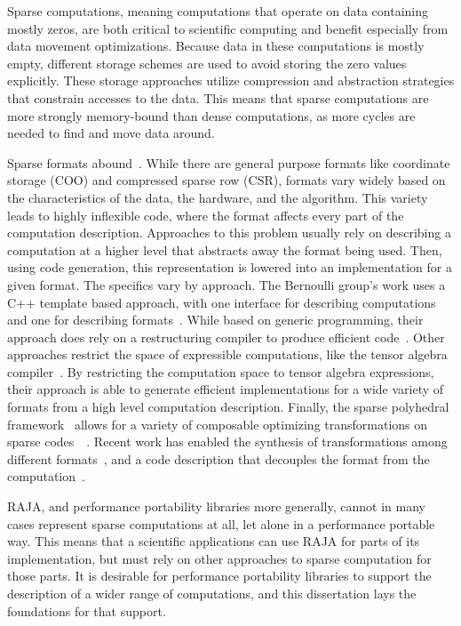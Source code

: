 Sparse computations, meaning computations that operate on data containing mostly zeros, are both critical to scientific computing and benefit especially from data movement optimizations.
Because data in these computations is mostly empty, different storage schemes are used to avoid storing the zero values explicitly. 
These storage approaches utilize compression and abstraction strategies that constrain accesses to the data.
This means that sparse computations are more strongly memory-bound than dense computations, as more cycles are needed to find and move data around.

Sparse formats abound~\cite{langr2015evaluation}. 
While there are general purpose formats like coordinate storage (COO) and compressed sparse row (CSR), formats vary widely based on the characteristics of the data, the hardware, and the algorithm.
This variety leads to highly inflexible code, where the format affects every part of the computation description.
Approaches to this problem usually rely on describing a computation at a higher level that abstracts away the format being used.
Then, using code generation, this representation is lowered into an implementation for a given format.
The specifics vary by approach.
The Bernoulli group's work uses a C++ template based approach, with one interface for describing computations~\cite{kotlyar1997relational} and one for describing formats~\cite{kotlyar1997compiling}.
While based on generic programming, their approach does rely on a restructuring compiler to produce efficient code~\cite{mateev2000bernoulli,ahmed2000framework}.
Other approaches restrict the space of expressible computations, like the tensor algebra compiler~\cite{kjolstad2017tensor}.
By restricting the computation space to tensor algebra expressions, their approach is able to generate efficient implementations for a wide variety of formats from a high level computation description.
Finally, the sparse polyhedral framework~\cite{strout2016approach} allows for a variety of composable optimizing transformations on sparse codes~~\cite{ahmad2017optimizing}.
Recent work has enabled the synthesis of transformations among different formats~\cite{popoola2023code}, and a code description that decouples the format from the computation~\cite{zhao2022polyhedral}.

RAJA, and performance portability libraries more generally, cannot in many cases represent sparse computations at all, let alone in a performance portable way.
This means that a scientific applications can use RAJA for parts of its implementation, but must rely on other approaches to sparse computation for those parts.
It is desirable for performance portability libraries to support the description of a wider range of computations, and this dissertation lays the foundations for that support.

